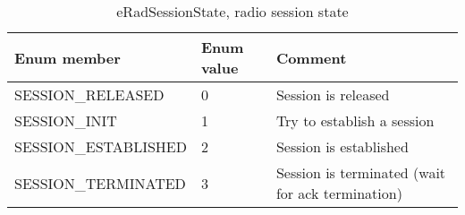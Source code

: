 \documentclass{template/openetcs_article}
\begin{document}
\begin{longtable}{|l|l|l|}
	\caption{eRadSessionState, radio session state} \\ 
	\hline
		\begin{minipage}[t]{0.45\linewidth} \textbf{Enum member}	\end{minipage}
	&	\begin{minipage}[t]{0.10\linewidth} \textbf{Enum value}	\end{minipage} 
	&	\begin{minipage}[t]{0.50\linewidth} \textbf{Comment} \end{minipage} \\
	\hline
		\begin{minipage}[t]{0.45\linewidth} SESSION\_RELEASED \end{minipage} 
	&	\begin{minipage}[t]{0.10\linewidth} 0 \end{minipage} 
	&	\begin{minipage}[t]{0.50\linewidth} Session is released\end{minipage}\\
	\hline
		\begin{minipage}[t]{0.45\linewidth} SESSION\_INIT \end{minipage} 
	&	\begin{minipage}[t]{0.10\linewidth} 1 \end{minipage} 
	&	\begin{minipage}[t]{0.50\linewidth} Try to establish a session \end{minipage}\\
	\hline
		\begin{minipage}[t]{0.45\linewidth} SESSION\_ESTABLISHED \end{minipage} 
	&	\begin{minipage}[t]{0.10\linewidth} 2 \end{minipage} 
	&	\begin{minipage}[t]{0.50\linewidth} Session is established\end{minipage}\\
	\hline
		\begin{minipage}[t]{0.45\linewidth} SESSION\_TERMINATED \end{minipage} 
	&	\begin{minipage}[t]{0.10\linewidth} 3 \end{minipage} 
	&	\begin{minipage}[t]{0.50\linewidth} Session is terminated (wait for ack termination) \end{minipage}\\
	\hline
\end{longtable}
\end{document}
